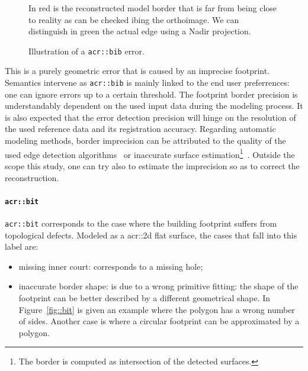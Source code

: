 \begin{figure}[H]
{\begin{subfloatrow}
{                                }{
                                    \label{subfig::bib_2d}
                                    \caption{
                                        In red is the reconstructed model border that is far from being close to reality as can be checked ibing the orthoimage.
                                        We can distinguish in green the actual edge using a Nadir projection.
                                    }
                                }
                        \end{subfloatrow}
                    }{
                        \caption{
                            \label{fig::bib}
                            Illustration of a \texttt{\gls{acr::bib}} error.
                        }
                    }
                \end{figure}

                This is a purely geometric error that is caused by an imprecise footprint.
                Semantics intervene as \texttt{\gls{acr::bib}} is mainly linked to the end user preferrences: one can ignore errors up to a certain threshold. 
                The footprint border precision is understandably dependent on the used input data during the modeling process.
                It is also expected that the error detection precision will hinge on the resolution of the used reference data and its registration accuracy.
                Regarding automatic modeling methods, border imprecision can be attributed to the quality of the used edge detection algorithms~\parencite{nan2015template,baillard1999automatic,werner2002new} or inaccurate surface estimation\footnote{
                    The border is computed as intersection of the detected surfaces.
                }~\parencite{durupt2006automatic,xiong2014graph}.
                Outside the scope this study, one can try also to estimate the imprecision so as to correct the reconstruction.

            \paragraph{\texttt{\acrlong*{acr::bit}}}
                \texttt{\gls{acr::bit}} corresponds to the case where the building footprint suffers from topological defects.
                Modeled as a \gls{acr::2d} flat surface, the cases that fall into this label are:
                \begin{itemize}
                    \item missing inner court: corresponds to a missing hole;
                    \item inaccurate border shape:  is due to a wrong primitive fitting: the shape of the footprint can be better described by a different geometrical shape.
                            In Figure~\ref{fig::bit} is given an example where the polygon has a wrong number of sides.
                            Another case is where a circular footprint can be approximated by a polygon.
                \end{itemize}

